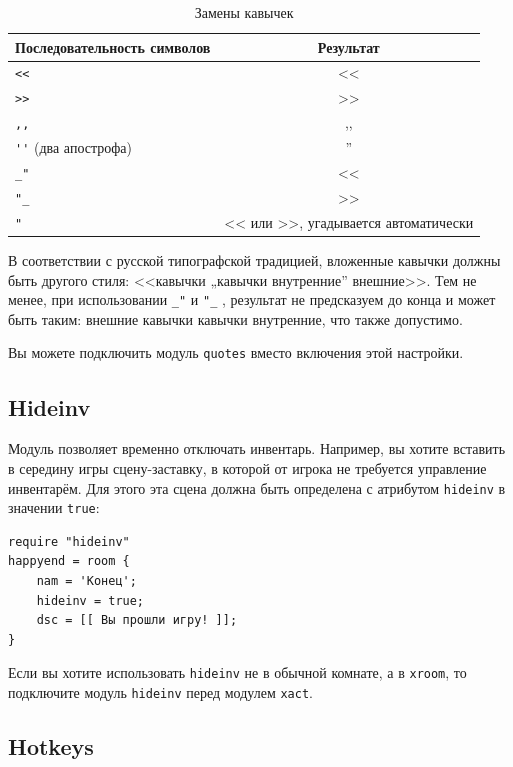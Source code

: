 \documentclass[12pt]{article}
\begin{document}
\begin{table}[ht]
\begin{center}
\begin{tabular}{|lc|}
\hline
Последовательность символов & Результат \\
\hline
\verb/<</ & <<\\
\verb/>>/ & >>\\
\verb/,,/ & ,,\\
\verb/''/ (два апострофа) & ''\\
\verb/_"/ & <<\\
\verb/"_/ & >>\\
\verb/"/ & << или >>, угадывается автоматически\\
\hline
\end{tabular}
\end{center}
\caption{Замены кавычек}\label{table_quotes}
\end{table}

В соответствии с русской типографской традицией, вложенные кавычки должны быть другого стиля: <<кавычки „кавычки внутренние” внешние>>. Тем не менее, при использовании \verb/_"/ и \verb/"_/ , результат не предсказуем до конца и может быть таким: \guillemotleft внешние кавычки \guillemotleft кавычки внутренние\guillemotright, что также допустимо.

Вы можете подключить модуль \verb/quotes/ вместо включения этой настройки.


\subsection{Hideinv}

Модуль позволяет временно отключать инвентарь. Например, вы хотите вставить в середину игры сцену-заставку, в которой от игрока не требуется управление инвентарём. Для этого эта сцена должна быть определена с атрибутом \verb/hideinv/ в значении \verb/true/:

\begin{verbatim}
require "hideinv"
happyend = room {
    nam = 'Конец';
    hideinv = true;
    dsc = [[ Вы прошли игру! ]];
}
\end{verbatim}

Если вы хотите использовать \verb/hideinv/ не в обычной комнате, а в \verb/xroom/, то подключите модуль \verb/hideinv/ перед модулем \verb/xact/.

\subsection{Hotkeys}
\end{document}
